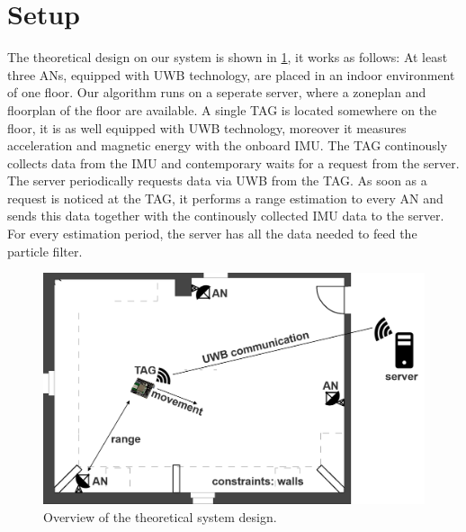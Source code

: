 
\section{Setup}
The theoretical design on our system is shown in \ref{fig:system_design}, it works as follows:
At least three ANs, equipped with UWB technology, are placed in an indoor environment of one floor. Our algorithm runs on a seperate server, where a zoneplan and floorplan of the floor are available. A single TAG is located somewhere on the floor, it is as well equipped with UWB technology, moreover it measures acceleration and magnetic energy with the onboard IMU. The TAG continously collects data from the IMU and contemporary waits for a request from the server. The server periodically requests data via UWB from the TAG. As soon as a request is noticed at the TAG, it performs a range estimation to every AN and sends this data together with the continously collected IMU data to the server.
For every estimation period, the server has all the data needed to feed the particle filter.

\begin{figure}[th]
\centering
\includegraphics[width=1.0\textwidth]{Figures/system_design}
\decoRule
\caption[System Design]{Overview of the theoretical system design.}
\label{fig:system_design}
\end{figure}


